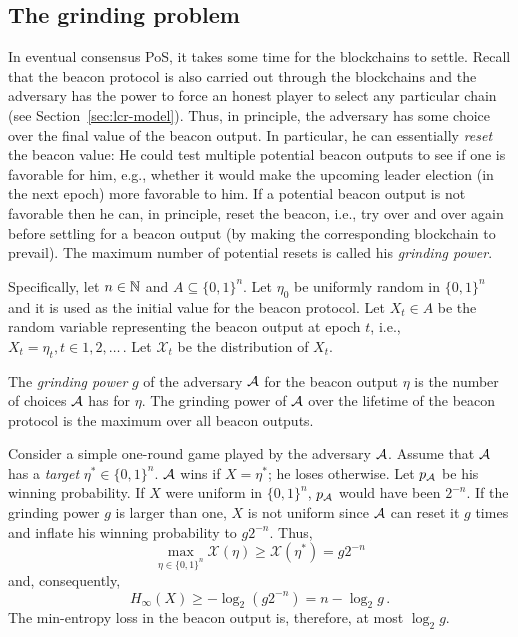 \subsection{The grinding problem}
In eventual consensus PoS, 
it takes some time for the blockchains to settle. 
Recall that the beacon protocol is also carried out through the blockchains 
and the adversary has the power to force an honest player 
to select any particular chain (see Section~\ref{sec:lcr-model}).
Thus, in principle, 
the adversary has some choice over the final value of the beacon output.
In particular, he can essentially \emph{reset} the beacon value: 
He could test multiple potential beacon outputs to see if one is favorable for him, 
e.g., whether it would make the upcoming leader election (in the next epoch) 
more favorable to him. 
If a potential beacon output is not favorable then he can, in principle, reset the beacon, 
i.e., try over and over again before settling for a beacon output 
(by making the corresponding blockchain to prevail). 
The maximum number of potential resets is called his \emph{grinding power}.

Specifically, let $n \in \mathbb{N}$ and $A \subseteq \{0,1\}^n$.
Let $\eta_0$ be uniformly random in $\{0,1\}^n$ 
and it is used as the initial value for the beacon protocol. 
Let $X_t \in A$ be the random variable 
representing the beacon output at epoch $t$, 
i.e., $X_t = \eta_t, t \in 1, 2, \ldots$\,. 
Let $\mathcal{X}_t$ be the distribution of $X_t$. 

\begin{definition}
The \emph{grinding power} $g$ of the adversary $\mathcal{A}$ 
for the beacon output $\eta$
is the number of choices $\mathcal{A}$ has for $\eta$. 
The grinding power of $\mathcal{A}$ over 
the lifetime of the beacon protocol
is the maximum over all beacon outputs.
\end{definition}

Consider a simple one-round game played by the adversary $\mathcal{A}$. 
Assume that $\mathcal{A}$ has a \emph{target} $\eta^* \in \{0,1\}^n$. 
$\mathcal{A}$ wins if $X = \eta^*$; he loses otherwise. 
Let $p_{\mathcal{A}}$ be his winning probability. 
If $X$ were uniform in $\{0,1\}^n$, 
$p_{\mathcal{A}}$ would have been $2^{-n}$. 
If the grinding power $g$ is larger than one, 
$X$ is not uniform since 
$\mathcal{A}$ can reset it $g$ times 
and inflate his winning probability to $g 2^{-n}$. 
Thus, 
$$ 
    \max_{\eta \in \{0,1\}^n} \mathcal{X}(\eta) \geq \mathcal{X}(\eta^*) = g 2^{-n}
$$ 
and, consequently, 
$$
    H_\infty(X) \geq -\log_2 (g 2^{-n}) = n - \log_2 g
    \,.
$$
The min-entropy loss in the beacon output is, therefore, 
at most $\log_2 g$. 

